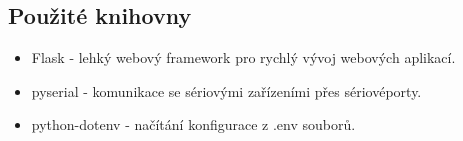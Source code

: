 \subsection*{Použité knihovny}
\begin{itemize}
    \item Flask - lehký webový framework pro rychlý vývoj webových aplikací.
    \item pyserial - komunikace se sériovými zařízeními přes sériovéporty.
    \item python-dotenv - načítání konfigurace z .env souborů.
\end{itemize}

